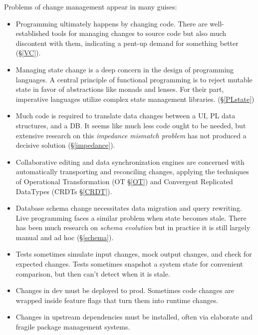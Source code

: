 \documentclass[english,submission]{programming}
\theoremstyle{definition}
\begin{document}
Problems of change management appear in many guises:
\begin{itemize}

  \item Programming ultimately happens by changing code. There are well-established tools for managing changes to source code but also much discontent with them, indicating a pent-up demand for something better (\S\ref{VC}).

  \item Managing state change is a deep concern in the design of programming languages. A central principle of functional programming is to reject mutable state in favor of abstractions like monads and lenses. For their part, imperative languages utilize complex state management libraries. (\S\ref{PLstate})

  \item Much code is required to translate data changes between a UI, PL data structures, and a DB. It seems like much less code ought to be needed, but extensive research on this \textit{impedance mismatch problem} has not produced a decisive solution (\S\ref{impedance}).

  \item Collaborative editing and data synchronization engines are concerned with automatically transporting and reconciling changes, applying the techniques of Operational Transformation (OT \S\ref{OT}) and Convergent Replicated DataTypes (CRDTs \S\ref{CRDT}).

  \item Database schema change necessitates data migration and query rewriting. Live programming faces a similar problem when state becomes stale. There has been much research on \textit{schema evolution} but in practice it is still largely manual and ad hoc (\S \ref{schema}).

  \item Tests sometimes simulate input changes, mock output changes, and check for expected changes. Tests sometimes snapshot a system state for convenient comparison, but then can't detect when it is stale.

  \item Changes in dev must be deployed to prod.
  Sometimes code changes are wrapped inside feature flags that turn them into runtime changes.

  \item Changes in upstream dependencies must be installed, often via elaborate and fragile package management systems.

\end{itemize}
\end{document}
